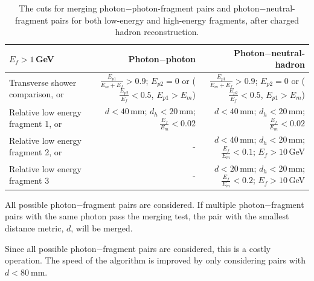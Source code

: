 \begin{table}[htbp]
\begin{tabular}{l  r  r }
\hline
$E_f>1$\,GeV &  Photon$-$photon & Photon$-$neutral-hadron \\
\hline
\multicolumn{1}{L{0.3\textwidth}}{Transverse shower comparison, or} & \multicolumn{1}{R{0.3\textwidth}}{$\frac{E_{p1}}{E_m + E_f} > 0.9 $; $E_{p2} = 0$ or ($\frac{E_{p2}}{E_f} < 0.5 $, $E_{p1} > E_m$)}  & \multicolumn{1}{R{0.3\textwidth}}{$\frac{E_{p1}}{E_m + E_f} > 0.9 $; $E_{p2} = 0$ or ($\frac{E_{p2}}{E_f} < 0.5 $, $E_{p1} > E_m$)} \\
\multicolumn{1}{L{0.3\textwidth}}{Relative low energy fragment 1, or} & \multicolumn{1}{R{0.3\textwidth}}{$d < 40$\,mm; $d_h < 20$\,mm; $\frac{E_f}{E_m} < 0.02$} & \multicolumn{1}{R{0.3\textwidth}}{$d < 40$\,mm; $d_h < 20$\,mm; $\frac{E_f}{E_m} < 0.02$} \\
\multicolumn{1}{L{0.3\textwidth}}{Relative low energy fragment 2, or} & \multicolumn{1}{R{0.3\textwidth}}{-}  & \multicolumn{1}{R{0.3\textwidth}}{$d < 40$\,mm; $d_h < 20$\,mm; $\frac{E_f}{E_m} < 0.1$; $E_f > 10$\,GeV} \\
\multicolumn{1}{L{0.3\textwidth}}{Relative low energy fragment 3} & \multicolumn{1}{R{0.3\textwidth}}{-}  & \multicolumn{1}{R{0.3\textwidth}}{$d < 20$\,mm; $d_h < 20$\,mm; $\frac{E_f}{E_m} < 0.2$; $E_f > 10$\,GeV} \\
\hline
\hline
\end{tabular}

\caption[The cuts for photon fragment removal algorithm in the \ECAL.]%
{The cuts for merging photon$-$photon-fragment pairs and photon$-$neutral-fragment pairs for both low-energy and high-energy fragments, after charged hadron reconstruction.}
\label{tab:photonFragRemovalCuts}
\end{table}


All possible  photon$-$fragment pairs are considered. If multiple photon$-$fragment pairs with the same photon pass the merging test, the pair with the smallest distance metric, $d$, will be merged.

Since all possible photon$-$fragment pairs are considered, this is a costly operation. The speed of the algorithm is improved by only considering pairs with $d<80\ \text{mm}$.







